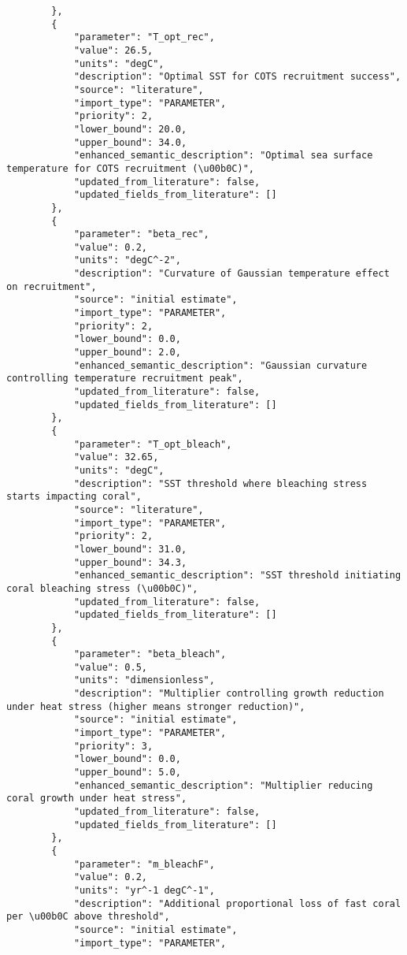 \begin{lstlisting}
        },
        {
            "parameter": "T_opt_rec",
            "value": 26.5,
            "units": "degC",
            "description": "Optimal SST for COTS recruitment success",
            "source": "literature",
            "import_type": "PARAMETER",
            "priority": 2,
            "lower_bound": 20.0,
            "upper_bound": 34.0,
            "enhanced_semantic_description": "Optimal sea surface temperature for COTS recruitment (\u00b0C)",
            "updated_from_literature": false,
            "updated_fields_from_literature": []
        },
        {
            "parameter": "beta_rec",
            "value": 0.2,
            "units": "degC^-2",
            "description": "Curvature of Gaussian temperature effect on recruitment",
            "source": "initial estimate",
            "import_type": "PARAMETER",
            "priority": 2,
            "lower_bound": 0.0,
            "upper_bound": 2.0,
            "enhanced_semantic_description": "Gaussian curvature controlling temperature recruitment peak",
            "updated_from_literature": false,
            "updated_fields_from_literature": []
        },
        {
            "parameter": "T_opt_bleach",
            "value": 32.65,
            "units": "degC",
            "description": "SST threshold where bleaching stress starts impacting coral",
            "source": "literature",
            "import_type": "PARAMETER",
            "priority": 2,
            "lower_bound": 31.0,
            "upper_bound": 34.3,
            "enhanced_semantic_description": "SST threshold initiating coral bleaching stress (\u00b0C)",
            "updated_from_literature": false,
            "updated_fields_from_literature": []
        },
        {
            "parameter": "beta_bleach",
            "value": 0.5,
            "units": "dimensionless",
            "description": "Multiplier controlling growth reduction under heat stress (higher means stronger reduction)",
            "source": "initial estimate",
            "import_type": "PARAMETER",
            "priority": 3,
            "lower_bound": 0.0,
            "upper_bound": 5.0,
            "enhanced_semantic_description": "Multiplier reducing coral growth under heat stress",
            "updated_from_literature": false,
            "updated_fields_from_literature": []
        },
        {
            "parameter": "m_bleachF",
            "value": 0.2,
            "units": "yr^-1 degC^-1",
            "description": "Additional proportional loss of fast coral per \u00b0C above threshold",
            "source": "initial estimate",
            "import_type": "PARAMETER",

\end{lstlisting}
